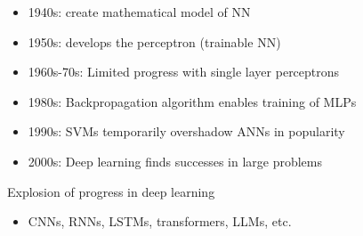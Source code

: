 \begin{frame}


    \begin{itemize}
        \item 1940s:  create mathematical model of NN
        \vspace{0.5em}
        \item 1950s:  develops the perceptron (trainable NN)
        \vspace{0.5em}
        \item 1960s-70s: Limited progress with single layer perceptrons
        \vspace{0.5em}
        \item 1980s: Backpropagation algorithm enables training of MLPs
        \vspace{0.5em}
        \item 1990s: SVMs temporarily overshadow ANNs in popularity
        \vspace{0.5em}
        \item 2000s: Deep learning finds successes in large problems
    \end{itemize}
    
        \vspace{0.5em}
        \vspace{0.5em}
     Explosion of progress in deep learning 

    \begin{itemize}
        \item CNNs, RNNs, LSTMs, transformers, LLMs, etc.
    \end{itemize}

\end{frame}

